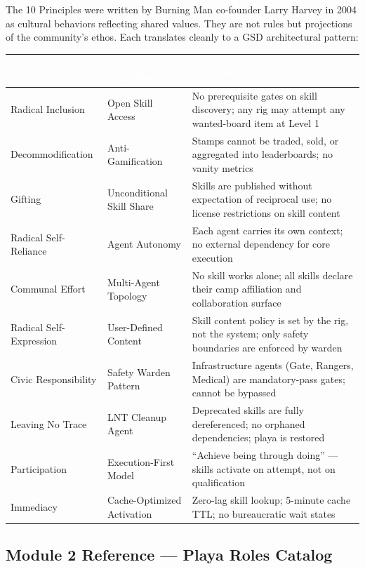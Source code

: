 \documentclass[11pt,letterpaper]{article}
\newcommand{\tableheader}[1]{\textbf{\sffamily\textcolor{white}{#1}}}
\begin{document}
The 10 Principles were written by Burning Man co-founder Larry Harvey in 2004 as cultural behaviors reflecting shared values. They are not rules but projections of the community's ethos. Each translates cleanly to a GSD architectural pattern:

\begin{center}
\begin{tabularx}{\textwidth}{L{3.5cm}L{4cm}X}
\toprule
{}
\tableheader{Principle} & \tableheader{GSD Guideline} & \tableheader{Implementation Pattern} \\
\midrule
Radical Inclusion & Open Skill Access & No prerequisite gates on skill discovery; any rig may attempt any wanted-board item at Level 1 \\
Decommodification & Anti-Gamification & Stamps cannot be traded, sold, or aggregated into leaderboards; no vanity metrics \\
Gifting & Unconditional Skill Share & Skills are published without expectation of reciprocal use; no license restrictions on skill content \\
Radical Self-Reliance & Agent Autonomy & Each agent carries its own context; no external dependency for core execution \\
Communal Effort & Multi-Agent Topology & No skill works alone; all skills declare their camp affiliation and collaboration surface \\
Radical Self-Expression & User-Defined Content & Skill content policy is set by the rig, not the system; only safety boundaries are enforced by warden \\
Civic Responsibility & Safety Warden Pattern & Infrastructure agents (Gate, Rangers, Medical) are mandatory-pass gates; cannot be bypassed \\
Leaving No Trace & LNT Cleanup Agent & Deprecated skills are fully dereferenced; no orphaned dependencies; playa is restored \\
Participation & Execution-First Model & ``Achieve being through doing'' --- skills activate on attempt, not on qualification \\
Immediacy & Cache-Optimized Activation & Zero-lag skill lookup; 5-minute cache TTL; no bureaucratic wait states \\
\bottomrule
\end{tabularx}
\end{center}

\subsection{Module 2 Reference --- Playa Roles Catalog}
\end{document}
